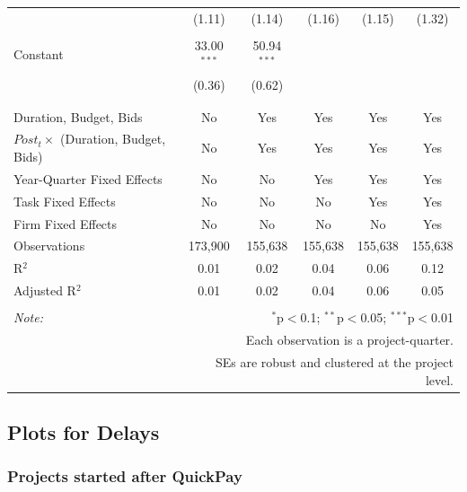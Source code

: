 \documentclass[
]{article}
\begin{document}
\begin{table}[H]
\begin{tabular}{@{\extracolsep{-2pt}}lccccc}
  & (1.11) & (1.14) & (1.16) & (1.15) & (1.32) \\ 
  & & & & & \\ 
 Constant & 33.00$^{***}$ & 50.94$^{***}$ &  &  &  \\ 
  & (0.36) & (0.62) &  &  &  \\ 
  & & & & & \\ 
\hline \\[-1.8ex] 
Duration, Budget, Bids & No & Yes & Yes & Yes & Yes \\ 
$Post_t \times $  (Duration, Budget, Bids) & No & Yes & Yes & Yes & Yes \\ 
Year-Quarter Fixed Effects & No & No & Yes & Yes & Yes \\ 
Task Fixed Effects & No & No & No & Yes & Yes \\ 
Firm Fixed Effects & No & No & No & No & Yes \\ 
Observations & 173,900 & 155,638 & 155,638 & 155,638 & 155,638 \\ 
R$^{2}$ & 0.01 & 0.02 & 0.04 & 0.06 & 0.12 \\ 
Adjusted R$^{2}$ & 0.01 & 0.02 & 0.04 & 0.06 & 0.05 \\ 
\hline 
\hline \\[-1.8ex] 
\textit{Note:}  & \multicolumn{5}{r}{$^{*}$p$<$0.1; $^{**}$p$<$0.05; $^{***}$p$<$0.01} \\ 
 & \multicolumn{5}{r}{Each observation is a project-quarter.} \\ 
 & \multicolumn{5}{r}{SEs are robust and clustered at the project level.} \\ 
\end{tabular} 
\end{table}

\hypertarget{plots-for-delays}{%
\subsection{Plots for Delays}\label{plots-for-delays}}

\hypertarget{projects-started-after-quickpay}{%
\subsubsection{Projects started after
QuickPay}\label{projects-started-after-quickpay}}
\end{document}
